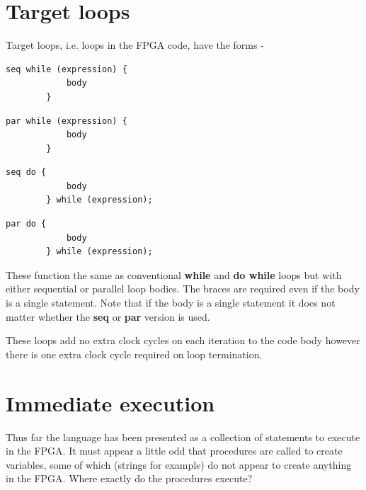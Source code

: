 \documentclass[10pt,a4paper,twoside,fleqn]{article}
\newcommand{\kwd}[1]{{\bf #1}} %
\begin{document}
\section{Target loops}

    Target loops, i.e. loops in the FPGA code, have the forms -
    \begin{lstlisting}[language=threepl]
        seq while (expression) {
            body
        }
    \end{lstlisting}
    \begin{lstlisting}[language=threepl]
        par while (expression) {
            body
        }
    \end{lstlisting}
    \begin{lstlisting}[language=threepl]
        seq do {
            body
        } while (expression);
    \end{lstlisting}
    \begin{lstlisting}[language=threepl]
        par do {
            body
        } while (expression);
    \end{lstlisting}
    
    These function the same as conventional \kwd{while} and \kwd{do while} loops
    but with either sequential or parallel loop bodies. The braces are required
    even if the body is a single statement. Note that if the body is a single
    statement it does not matter whether the \kwd{seq} or \kwd{par} version is used.
    
    These loops add no extra clock cycles on each iteration to the code body
    however there is one extra clock cycle required on loop termination.

\section{Immediate execution}

    Thus far the language has been presented as a collection of statements
    to execute in the FPGA. It must appear a little odd that procedures are
    called to create variables, some of which (strings for example) do not appear
    to create anything in the FPGA. Where exactly do the procedures execute?
    
\end{document}
